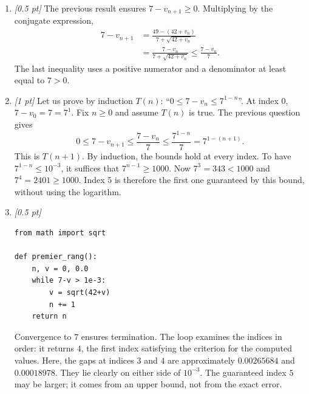 \begin{enumerate}
\item \textit{[0.5 pt]} The previous result ensures $7-v_{n+1}\ge0$. Multiplying by the conjugate expression,
\[\begin{aligned}7-v_{n+1}&=\frac{49-(42+v_n)}{7+\sqrt{42+v_n}}\\&=\frac{7-v_n}{7+\sqrt{42+v_n}}\le\frac{7-v_n}{7}.\end{aligned}\]
The last inequality uses a positive numerator and a denominator at least equal to $7>0$.

\item \textit{[1 pt]} Let us prove by induction $T(n)$: ``$0\le 7-v_n\le 7^{1-n}$''.
At index $0$, $7-v_0=7=7^1$. Fix $n\ge0$ and assume $T(n)$ is true. The previous question gives
\[0\le 7-v_{n+1}\le\frac{7-v_n}{7}\le\frac{7^{1-n}}{7}=7^{1-(n+1)}.\]
This is $T(n+1)$. By induction, the bounds hold at every index.
To have $7^{1-n}\le10^{-3}$, it suffices that $7^{n-1}\ge1000$.
Now $7^{3}=343<1000$ and $7^{4}=2401\ge1000$. Index $5$ is therefore the first one guaranteed by this bound, without using the logarithm.


\item \textit{[0.5 pt]} 
\begin{lstlisting}
from math import sqrt

def premier_rang():
    n, v = 0, 0.0
    while 7-v > 1e-3:
        v = sqrt(42+v)
        n += 1
    return n
\end{lstlisting}
Convergence to $7$ ensures termination. The loop examines the indices in order: it returns $4$, the first index satisfying the criterion for the computed values. Here, the gaps at indices $3$ and $4$ are approximately $0.00265684$ and $0.00018978$. They lie clearly on either side of $10^{-3}$. The guaranteed index $5$ may be larger; it comes from an upper bound, not from the exact error.

\end{enumerate}

